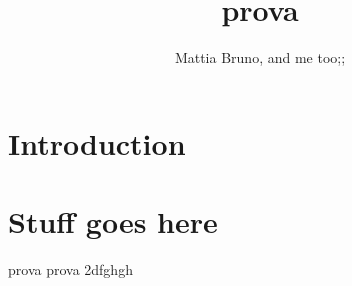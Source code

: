 \documentclass{article}
\title{prova}
\author{Mattia Bruno, and me too;;}
\date{today, \date,}
\begin{document}
\maketitle

\section{Introduction}

\section{Stuff goes here}    
prova
prova 2dfghgh
\end{document}
